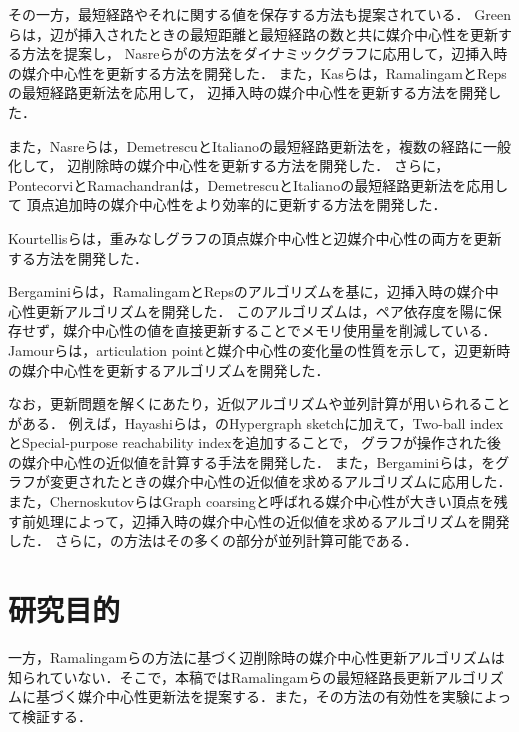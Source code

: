 その一方，最短経路やそれに関する値を保存する方法も提案されている．
Greenら\cite{Green2012}は，辺が挿入されたときの最短距離と最短経路の数と共に媒介中心性を更新する方法を提案し，
Nasreらが\cite{Karger1993}の方法をダイナミックグラフに応用して，辺挿入時の媒介中心性を更新する方法を開発した\cite{Nasre2014a}．
また，Kasら\cite{Kas2013}は，RamalingamとRepsの最短経路更新法\cite{Ramalingam1996}を応用して，
辺挿入時の媒介中心性を更新する方法を開発した．

また，Nasreら\cite{Nasre2014b}は，DemetrescuとItalianoの最短経路更新法\cite{Demetrescu2003}を，複数の経路に一般化して，
辺削除時の媒介中心性を更新する方法を開発した．
さらに，PontecorviとRamachandran\cite{Pontecorvi2015}は，DemetrescuとItalianoの最短経路更新法を応用して
頂点追加時の媒介中心性をより効率的に更新する方法を開発した．

Kourtellisらは，重みなしグラフの頂点媒介中心性と辺媒介中心性の両方を更新する方法を開発した\cite{Kourtellis2015}．

Bergaminiらは，RamalingamとRepsのアルゴリズムを基に，辺挿入時の媒介中心性更新アルゴリズムを開発した\cite{Bergamini2017}．
このアルゴリズムは，ペア依存度を陽に保存せず，媒介中心性の値を直接更新することでメモリ使用量を削減している．
Jamourらは，articulation pointと媒介中心性の変化量の性質を示して，辺更新時の媒介中心性を更新するアルゴリズムを開発した\cite{Jamour2017}．

なお，更新問題を解くにあたり，近似アルゴリズムや並列計算が用いられることがある．
例えば，Hayashiらは，\cite{Yoshida2014}のHypergraph sketchに加えて，Two-ball indexとSpecial-purpose reachability indexを追加することで，
グラフが操作された後の媒介中心性の近似値を計算する手法を開発した\cite{Hayashi2015}．
また，Bergaminiらは，\cite{Riondato2014}をグラフが変更されたときの媒介中心性の近似値を求めるアルゴリズムに応用した\cite{Bergamini2015a,Bergamini2015b}．
また，ChernoskutovらはGraph coarsingと呼ばれる媒介中心性が大きい頂点を残す前処理によって，辺挿入時の媒介中心性の近似値を求めるアルゴリズムを開発した\cite{Chernoskutov2015}．
さらに，\cite{Jamour2017}の方法はその多くの部分が並列計算可能である\cite{Jamour2017}．

\section{研究目的}
一方，Ramalingamらの方法に基づく辺削除時の媒介中心性更新アルゴリズムは知られていない．そこで，本稿ではRamalingamらの最短経路長更新アルゴリズムに基づく媒介中心性更新法を提案する．また，その方法の有効性を実験によって検証する．

